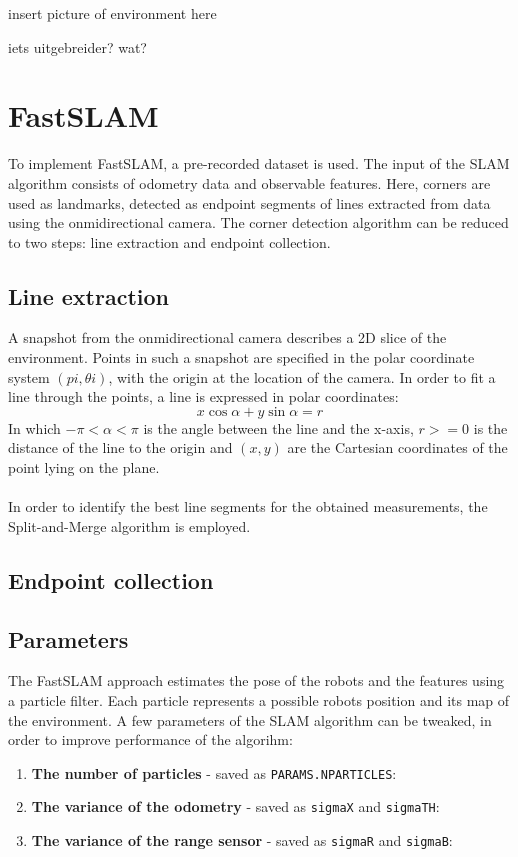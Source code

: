 \documentclass[12pt]{article}
\begin{document}
insert picture of environment here

iets uitgebreider? wat?

\section{FastSLAM}
To implement FastSLAM, a pre-recorded dataset is used. The input of the SLAM algorithm consists of odometry data and observable features. Here, corners are used as landmarks, detected as endpoint segments of lines extracted from data using the onmidirectional camera. The corner detection algorithm can be reduced to two steps: line extraction and endpoint collection.
\subsection{Line extraction}
A snapshot from the onmidirectional camera describes a 2D slice of the environment. Points in such a snapshot are specified in the polar coordinate system $(pi, {\theta}i)$, with the origin at the location of the camera. In order to fit a line through the points, a line is expressed in polar coordinates:
\begin{equation}
	x\cos{\alpha} + y\sin{\alpha} = r
\end{equation}
In which $-\pi < \alpha < \pi$ is the angle between the line and the x-axis, $r >= 0$ is the distance of the line to the origin and $(x, y)$ are the Cartesian coordinates of the point lying on the plane. \\ \\
In order to identify the best line segments for the obtained measurements, the Split-and-Merge algorithm is employed.
\subsection{Endpoint collection}

\subsection{Parameters}
The FastSLAM approach estimates the pose of the robots and the features using a particle filter. Each particle represents a possible robots position and its map of the environment. A few parameters of the SLAM algorithm can be tweaked, in order to improve performance of the algorihm:
\begin{enumerate}
\item \textbf{The number of particles} - saved as \verb|PARAMS.NPARTICLES|:
\item \textbf{The variance of the odometry} - saved as \verb|sigmaX| and \verb|sigmaTH|:
\item \textbf{The variance of the range sensor} - saved as \verb|sigmaR| and \verb|sigmaB|:
\end{enumerate}
\end{document}
